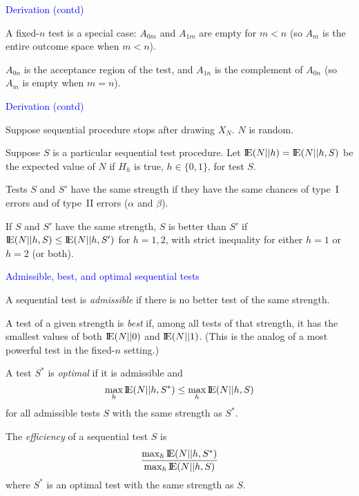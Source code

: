 \documentclass[landscape]{slides}
\newcommand{\EE}{\hbox{I\kern-.1667em\hbox{E}}}
\newcommand{\beq}{\begin{equation}}
\newcommand{\eeq}{\end{equation}}
\begin{document}
\begin{slide}
{\textcolor{blue}{Derivation (contd)}}

A fixed-$n$ test is a special case:  $A_{0m}$ and $A_{1m}$ are empty for $m < n$
(so $A_m$ is the entire outcome space when $m < n$).

$A_{0n}$ is the acceptance region of the test, and $A_{1n}$ is the complement of
$A_{0n}$ (so $A_m$ is empty when $m = n$).


\end{slide}

\begin{slide}
{\textcolor{blue}{Derivation (contd)}}

Suppose sequential procedure stops after drawing $X_N$.
$N$ is random.

Suppose $S$ is a particular sequential test procedure.
Let $\EE (N || h) = \EE (N || h, S)$ be the expected value of 
$N$ if $H_h$ is true,  $h \in \{0, 1\}$,
for test $S$.

Tests $S$ and $S'$ have the same strength if they have the same chances 
of type~I errors and of type~II errors ($\alpha$ and $\beta$).

If $S$ and $S'$ have the same strength, $S$ is better than $S'$ if 
$\EE (N || h, S) \le \EE (N || h, S')$
for $h = 1, 2$, with strict inequality for either $h=1$ or $h=2$ (or both).

\end{slide}


\begin{slide}
{\textcolor{blue}{Admissible, best, and optimal sequential tests}}

A sequential test is {\em admissible\/} if there is no better test of the same strength.

A test of a given strength is {\em best\/} if, among all tests of that strength, it has the
smallest values of both $\EE (N || 0) $ and $\EE (N || 1)$.
(This is the analog of a most powerful test in the fixed-$n$ setting.)

A test $S^*$ is {\em optimal\/} if it is admissible and
\beq
    \max_h \EE (N || h, S^*) \le \max_h \EE (N || h, S)
\eeq
for all admissible tests $S$ with the same strength as $S^*$.

The {\em efficiency\/} of a sequential test $S$ is 
\beq
    \frac{\max_h \EE (N || h, S^*)}{\max_h \EE (N || h, S)}
\eeq
where $S^*$ is an optimal test with the same strength as $S$.


\end{slide}
\end{document}
